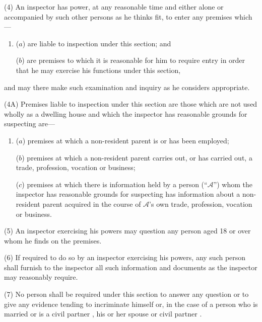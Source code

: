 \documentclass[12pt,a4paper]{article}
\begin{document}
(4) An inspector has power, at any reasonable time and either alone or accompanied by such other persons as he thinks fit, to enter any premises which—
\begin{enumerate}\item[]
($a$) are liable to inspection under this section; and

($b$) are premises to which it is reasonable for him to require entry in order that he may exercise his functions under this section,
\end{enumerate}
and may there make such examination and inquiry as he considers appropriate.

(4A) Premises liable to inspection under this section are those which are not used wholly as a dwelling house and which the inspector has reasonable grounds for suspecting are—
\begin{enumerate}\item[]
($a$) premises at which a non-resident parent is or has been employed;

($b$) premises at which a non-resident parent carries out, or has carried out, a trade, profession, vocation or business;

($c$) premises at which there is information held by a person (“$\mathcal{A}$”) whom the inspector has reasonable grounds for suspecting has information about a non-resident parent acquired in the course of $\mathcal{A}$’s own trade, profession, vocation or business.
\end{enumerate}

(5) An inspector exercising his powers may question any person aged 18 or over whom he finds on the premises.

(6) If required to do so by an inspector exercising his powers, 
%
%
%
any such person  %
shall furnish to the inspector all such information and documents as the inspector may 
reasonably require.

(7) No person shall be required under this section to answer any question or to give any evidence tending to incriminate himself or, in the case of a person who is married
or is a civil partner%
, his or her spouse
or civil partner%
.
\end{document}
